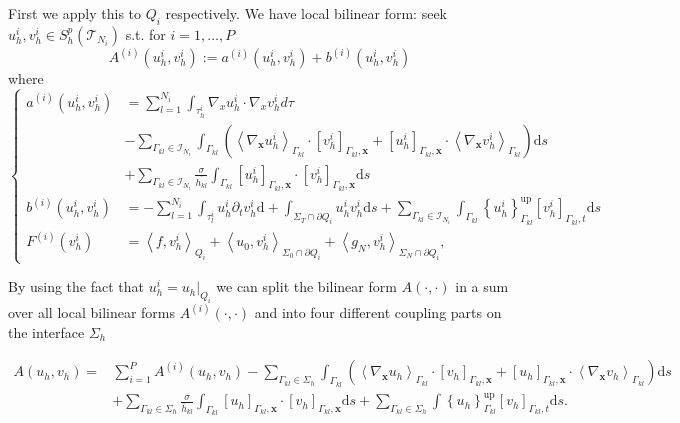 First we apply this to $Q_i$ respectively. We have local bilinear form: seek $u_h^i,v_h^i \in S_h^p(\mathscr{T}_{N_i})$ s.t. for  $i=1, \ldots, P$
$$A^{(i)}(u_h^i, v_h^i):=a^{(i)}(u_h^i,v_h^i)+b^{(i)}(u_h^i,v_h^i)$$
where 
$$\left\{\begin{aligned}
    a^{(i)}(u_h^i,v_h^i)&=\sum_{l=1}^{N_i}\int_{\tau_h^i}\nabla_x u_h^i\cdot \nabla_x v_h^i d\tau\\
    &-\sum_{\Gamma_{k l} \in \mathcal{I}_{N_{i}}} \int_{\Gamma_{k l}}\left(\left\langle\nabla_{\boldsymbol{x}} u_{h}^{i}\right\rangle_{\Gamma_{k l}} \cdot\left[v_{h}^{i}\right]_{\Gamma_{k l}, \boldsymbol{x}} + \left[u_{h}^{i}\right]_{\Gamma_{k l}, \boldsymbol{x}} \cdot\left\langle\nabla_{\boldsymbol{x}} v_{h}^{i}\right\rangle_{\Gamma_{k l}}\right) \mathrm{d} s \\
    &+\sum_{\Gamma_{k l} \in \mathcal{I}_{N_{i}}} \frac{\sigma}{\overline{h_{k l}}} \int_{\Gamma_{k l}}\left[u_{h}^{i}\right]_{\Gamma_{k l}, \boldsymbol{x}} \cdot\left[v_{h}^{i}\right]_{\Gamma_{k l}, \boldsymbol{x}} \mathrm{d} s\\
    b^{(i)}\left(u_{h}^{i}, v_{h}^{i}\right)&= -\sum_{l=1}^{N_{i}} \int_{\tau_{l}^{i}} u_{h}^{i} \partial_{t} v_{h}^{i} \mathrm{d}+\int_{\Sigma_{T} \cap \partial Q_{i}} u_{h}^{i} v_{h}^{i} \mathrm{d} s 
     +\sum_{\Gamma_{k l} \in \mathcal{I}_{N_{i}} }\int_{\Gamma_{k l}}\left\{u_{h}^{i}\right\}_{\Gamma_{k l}}^{\mathrm{up}}\left[v_{h}^{i}\right]_{\Gamma_{k l}, t} \mathrm{d} s\\
    F^{(i)}\left(v_{h}^{i}\right)&=\left\langle f, v_{h}^{i}\right\rangle_{Q_{i}}+\left\langle u_{0}, v_{h}^{i}\right\rangle_{\Sigma_{0} \cap \partial Q_{i}}+\left\langle g_{N}, v_{h}^{i}\right\rangle_{\Sigma_{N} \cap \partial Q_{i}},
\end{aligned}\right.$$


By using the fact that  $u_{h}^{i}=u_{h}|_{Q_{i}}$  we can split the bilinear form  $A(\cdot, \cdot)$  in a sum over all local bilinear forms  $A^{(i)}(\cdot, \cdot)$  and into four different coupling parts on the interface  $\Sigma_{h}$ 

$$\begin{aligned}
    A\left(u_{h}, v_{h}\right)= & \sum_{i=1}^{P} A^{(i)}\left(u_{h}, v_{h}\right)
    -\sum_{\Gamma_{k l} \in \Sigma_{h}} \int_{\Gamma_{k l}}\left(\left\langle\nabla_{\boldsymbol{x}} u_{h}\right\rangle_{\Gamma_{k l}} \cdot\left[v_{h}\right]_{\Gamma_{k l}, \boldsymbol{x}} +\left[u_{h}\right]_{\Gamma_{k l}, \boldsymbol{x}} \cdot\left\langle\nabla_{\boldsymbol{x}} v_{h}\right\rangle_{\Gamma_{k l}}\right)\mathrm{d} s \\
    & +\sum_{\Gamma_{k l} \in \Sigma_{h}} \frac{\sigma}{\bar{h}_{k l}} \int_{\Gamma_{k l}}\left[u_{h}\right]_{\Gamma_{k l}, \boldsymbol{x}} \cdot\left[v_{h}\right]_{\Gamma_{k l}, \boldsymbol{x}} \mathrm{d} s +\sum_{\Gamma_{k l} \in \Sigma_{h}} \int\left\{u_{h}\right\}_{\Gamma_{k l}}^{\mathrm{up}}\left[v_{h}\right]_{\Gamma_{k l}, t} \mathrm{d} s .
\end{aligned}$$

